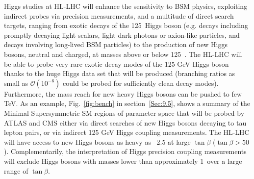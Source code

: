 \documentclass[../report.tex]{subfiles}
\begin{document}
Higgs studies at HL-LHC will enhance the sensitivity to BSM physics, exploiting indirect probes via precision measurements, and a multitude of direct search targets, ranging from exotic decays of the 125~\UGeV Higgs boson (e.g. decays including promptly decaying light scalars, light dark photons or axion-like particles, and decays involving long-lived BSM particles) to the production of new Higgs bosons, neutral and charged, at masses above or below 125~\UGeV.
The HL-LHC will be able to probe very rare exotic decay modes of the 125 GeV Higgs boson thanks to the huge Higgs data set that will be produced (branching ratios as small as $\mathcal O(10^{-6})$ could be probed for sufficiently clean decay modes). Furthermore, the mass reach for new heavy Higgs bosons can be pushed to few TeV. As an example, Fig.~\ref{fig:bench} in section~\ref{Sec:9.5}, shows a summary of the Minimal Supersymmetric SM regions of parameter space that will be probed by ATLAS and CMS either via direct searches of new Higgs bosons decaying to tau lepton pairs, or via indirect 125 GeV Higgs coupling measurements. The HL-LHC will have access to new Higgs bosons as heavy as ~2.5 \UTeV at large $\tan\beta$ ($\tan\beta>50$). Complementarily, the interpretation of Higgs precision coupling measurements will exclude Higgs bosons with masses lower than approximately 1~\UTeV over a large range of $\tan\beta$.
\end{document}
